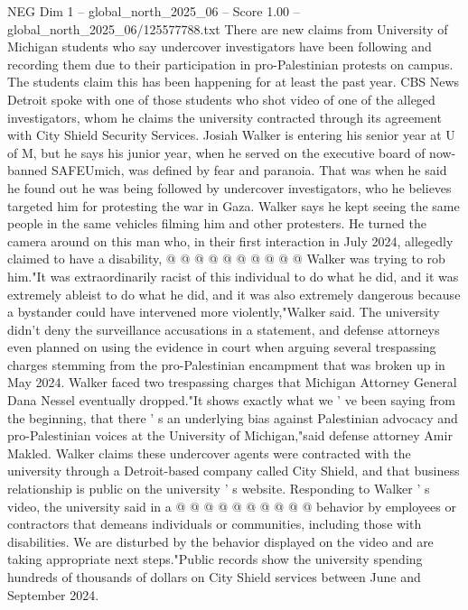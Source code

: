 \begin{textsample}{NEG Dim 1 – global\_north\_2025\_06 – Score 1.00 – global\_north\_2025\_06/125577788.txt}  \label{ex:f1_neg_142}
There are new claims from University of Michigan students who say undercover investigators have been following and recording them due to their participation in pro-Palestinian protests on campus.
The students claim this has been happening for at least the past year.
CBS News Detroit spoke with one of those students who shot video of one of the alleged investigators, whom he claims the university contracted through its agreement with City Shield Security Services.
Josiah Walker is entering his senior year at U of M, but he says his junior year, when he served on the executive board of now-banned SAFEUmich, was defined by fear and paranoia.
That was when he said he found out he was being followed by undercover investigators, who he believes targeted him for protesting the war in Gaza.
Walker says he kept seeing the same people in the same vehicles filming him and other protesters.
He turned the camera around on this man who, in their first interaction in July 2024, allegedly claimed to have a disability, @ @ @ @ @ @ @ @ @ @ Walker was trying to rob him."It was extraordinarily racist of this individual to do what he did, and it was extremely ableist to do what he did, and it was also extremely dangerous because a bystander could have intervened more violently,"Walker said.
The university didn't deny the surveillance accusations in a statement, and defense attorneys even planned on using the evidence in court when arguing several trespassing charges stemming from the pro-Palestinian encampment that was broken up in May 2024.
Walker faced two trespassing charges that Michigan Attorney General Dana Nessel eventually dropped."It shows exactly what we ' ve been saying from the beginning, that there ' s an underlying bias against Palestinian advocacy and pro-Palestinian voices at the University of Michigan,"said defense attorney Amir Makled.
Walker claims these undercover agents were contracted with the university through a Detroit-based company called City Shield, and that business relationship is public on the university ' s website.
Responding to Walker ' s video, the university said in a @ @ @ @ @ @ @ @ @ @ behavior by employees or contractors that demeans individuals or communities, including those with disabilities.
We are disturbed by the behavior displayed on the video and are taking appropriate next steps."Public records show the university spending hundreds of thousands of dollars on City Shield services between June and September 2024.

\end{textsample}
